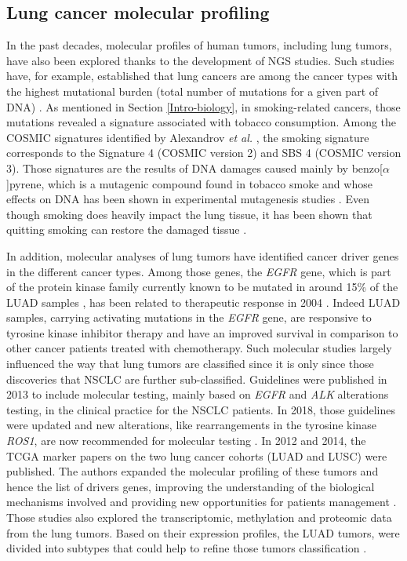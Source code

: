\subsection{Lung cancer molecular profiling}
In the past decades, molecular profiles of human tumors, including lung tumors, have also been explored thanks to the development of \gls{NGS} studies. Such studies have, for example, established that lung cancers are among the cancer types with the highest mutational burden (total number of mutations for a given part of \gls*{DNA}) \cite{Lawrence2013}.  
As mentioned in Section \ref{Intro-biology}, in smoking-related cancers, those mutations revealed a signature associated with tobacco consumption. Among the \gls{COSMIC} signatures identified by Alexandrov \textit{et al.} \cite{Alexandrov2013,Alexandrov2020}, the smoking signature corresponds to the Signature 4 (\gls{COSMIC} version 2) and SBS 4 (\gls{COSMIC} version 3). Those signatures are the results of \gls*{DNA} damages caused mainly by benzo[$\alpha$]pyrene, which is a mutagenic compound found in tobacco smoke and whose effects on \gls*{DNA} has been shown in experimental mutagenesis studies \cite{Nik-Zainal2015}. Even though smoking does heavily impact the lung tissue, it has been shown that quitting smoking can restore the damaged tissue \cite{Yoshida2020}.

In addition, molecular analyses of lung tumors have identified cancer driver genes in the different cancer types. Among those genes, the \textit{\gls{EGFR}} gene, which is part of the protein kinase family currently known to be mutated in around 15\% of the \gls{LUAD} samples \cite{Collisson2014}, has been related to therapeutic response in 2004 \cite{Politi2015}. Indeed LUAD samples, carrying activating mutations in the \textit{\gls{EGFR}} gene, are responsive to tyrosine kinase inhibitor therapy and have an improved survival in comparison to other cancer patients treated with chemotherapy. Such molecular studies largely influenced the way that lung tumors are classified since it is only since those discoveries that \gls{NSCLC} are further sub-classified. Guidelines were published in 2013 to include molecular testing, mainly based on \textit{\gls{EGFR}} and \textit{ALK} alterations testing, in the clinical practice for the \gls{NSCLC} patients. In 2018, those guidelines were updated and new alterations, like rearrangements in the tyrosine kinase \textit{ROS1}, are now recommended for molecular testing \cite{Lindeman2018}. In 2012 and 2014, the \gls{TCGA} marker papers on the two lung cancer cohorts (\gls{LUAD} and \gls{LUSC}) were published. The authors expanded the molecular profiling of these tumors and hence the list of drivers genes, improving the understanding of the biological mechanisms involved and providing new opportunities for patients management \cite{Network2012,Collisson2014}. Those studies also explored the transcriptomic, methylation and proteomic data from the lung tumors. Based on their expression profiles, the \gls{LUAD} tumors, were divided into subtypes that could help to refine those tumors classification \cite{Collisson2014}.

